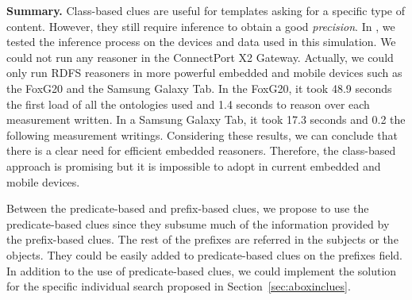 



\medskip

\noindent\textbf{Summary.}
Class-based clues are useful for templates asking for a specific type of content.
However, they still require inference to obtain a good \emph{precision}.
In \citet{gomez-goiri_restful_2012}, we tested the inference process on the devices and data used in this simulation.
We could not run any reasoner in the ConnectPort X2 Gateway.
Actually, we could only run RDFS reasoners in more powerful embedded and mobile devices such as the FoxG20 and the Samsung Galaxy Tab.
In the FoxG20, it took 48.9 seconds the first load of all the ontologies used and 1.4 seconds to reason over each measurement written.
In a Samsung Galaxy Tab, it took 17.3 seconds and 0.2 the following measurement writings.
Considering these results, we can conclude that there is a clear need for efficient embedded reasoners.
Therefore, the class-based approach is promising but it is impossible to adopt in current embedded and mobile devices.

Between the predicate-based and prefix-based clues, we propose to use the predicate-based clues since they subsume much of the information provided by the prefix-based clues.
The rest of the prefixes are referred in the subjects or the objects.
They could be easily added to predicate-based clues on the prefixes field.
In addition to the use of predicate-based clues, we could implement the solution for the specific individual search proposed in Section~\ref{sec:aboxinclues}.






